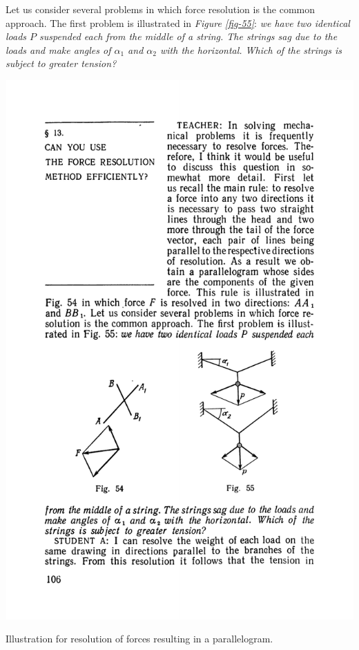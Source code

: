 \documentclass[a4paper,sfsidenotes]{tufte-book}
\begin{document}
Let us consider several problems in which force resolution is the common approach. The first problem is illustrated in \emph{Figure \ref{fig-55}}: \emph{we have two identical loads $P$ suspended each from the middle of a string. The strings sag due to the loads and make angles of $\alpha_{1}$ and $\alpha_{2}$ with the horizontal. Which of the strings is subject to greater tension?}
\\
\begin{marginfigure}[-4cm]
\centering
\includegraphics[width=0.8\linewidth]{fig-054a.pdf}
\caption{Illustration for resolution of forces resulting in a parallelogram.}
\label{fig-54}
\end{marginfigure}
\end{document}
